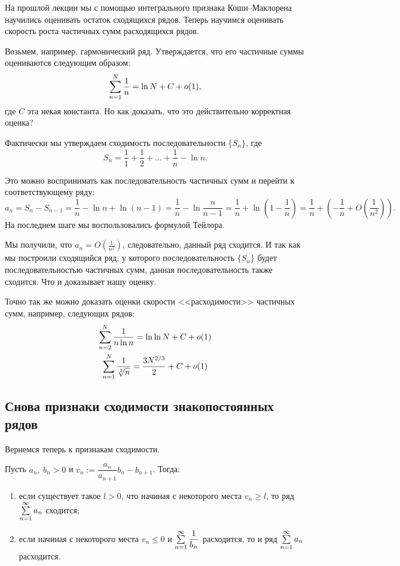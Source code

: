 На прошлой лекции мы с помощью интегрального признака Коши--Маклорена научились оценивать остаток сходящихся рядов. Теперь научимся оценивать скорость роста частичных сумм расходящихся рядов.

Возьмем, например, гармонический ряд. Утверждается, что его частичные суммы оцениваются следующим образом:
$$
\sum\limits_{n=1}^{N} \frac{1}{n} = \ln N + C + o(1),
$$
где $C$ эта некая константа. Но как доказать, что это действительно корректная оценка? 

Фактически мы утверждаем сходимость последовательности $\{S_n\}$, где
$$
S_n = \frac{1}{1} + \frac{1}{2} + \ldots + \frac{1}{n} - \ln n.
$$

Это можно воспринимать как последовательность частичных сумм и перейти к соответствующему ряду:
$$
a_n = S_n - S_{n-1} = \frac{1}{n} - \ln n + \ln(n-1) = \frac{1}{n} - \ln\frac{n}{n-1} = \frac{1}{n} + \ln\left(1 - \frac{1}{n}\right) = \frac{1}{n} + \left( - \frac{1}{n} + O\left(\frac{1}{n^2}\right) \right).
$$
На последнем шаге мы воспользовались формулой Тейлора.

Мы получили, что $a_n = O\left(\frac{1}{n^2}\right)$, следовательно, данный ряд сходится. И так как мы построили сходящийся ряд, у которого последовательность $\{ S_n\}$ будет последовательностью частичных сумм, данная последовательность также сходится. Что и доказывает нашу оценку.

Точно так же можно доказать оценки скорости <<расходимости>> частичных сумм, например, следующих рядов:
\begin{gather*}
\sum\limits_{n=2}^{N} \frac{1}{n\ln n} = \ln \ln N + C + o(1) \\
\sum\limits_{n=1}^{N} \frac{1}{\sqrt[3]{n}} = \frac{3N^{2/3}}{2} + C + o(1) 
\end{gather*}

\subsection{Снова признаки сходимости знакопостоянных рядов}
Вернемся теперь к признакам сходимости. 
\begin{Test}
Пусть $a_n,\ b_n > 0$ и $v_n := \dfrac{a_n}{a_{n+1}}b_n - b_{n+1}$. Тогда:
\begin{enumerate}
\item если существует такое $l > 0$, что начиная с некоторого места $v_n \geq l$, то ряд $\sum\limits_{n=1}^{\infty}a_n$ сходится;
\item если начиная с некоторого места $v_n \leq 0$ и $\sum\limits_{n=1}^{\infty}\dfrac{1}{b_n}$ расходится, то и ряд $\sum\limits_{n=1}^{\infty}a_n$ расходится.
\end{enumerate}
\end{Test}

